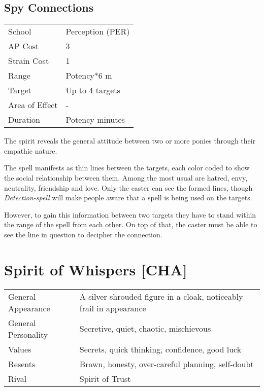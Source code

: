 \documentclass[11pt,a4paper,twocolumn]{book}
\begin{document}
\subsection*{Spy Connections}
{
	\begin{tabu} to 75mm{| X[l,4] | X[l,7] |}
		\hline
		School 			& Perception (PER) 		\\
		AP Cost	      	& 3 					\\
		Strain Cost     & 1 					\\
		Range     		& Potency*6 m			\\
		Target      	& Up to 4 targets		\\
		Area of Effect  & - 	 				\\
		Duration     	& Potency minutes		\\ \hline
	\end{tabu}
	
}

\medskip

The spirit reveals the general attitude between two or more ponies through their empathic nature.

The spell manifests as thin lines between the targets, each color coded to show the social relationship between them. Among the most usual are hatred, envy, neutrality, friendship and love. Only the caster can see the formed lines, though \textit{Detection-spell} will make people aware that a spell is being used on the targets.

However, to gain this information between two targets they have to stand within the range of the spell from each other. On top of that, the caster must be able to see the line in question to decipher the connection.


\section*{Spirit of Whispers [CHA]}
{
	\begin{tabu} to 75mm{| X[l,4] | X[l,8] |}
		\hline
		General Appearance  & A silver shrouded figure in a cloak, noticeably frail in appearance \\
		General Personality & Secretive, quiet, chaotic, mischievous                              \\
		Values              & Secrets, quick thinking, confidence, good luck                      \\
		Resents             & Brawn, honesty, over-careful planning, self-doubt                   \\
		Rival               & Spirit of Trust                                                     \\ \hline
	\end{tabu}
	
}
\end{document}
